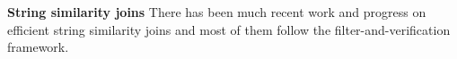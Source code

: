 




\smallskip

\noindent \textbf{String similarity joins}  There has been much recent work and progress on efficient string similarity joins  \cite{conf/sigmod/LuLWLW13,conf/icde/ArasuCK08,conf/cpm/BarbayGMR06,conf/vldb/ArvindSR09} and most of them follow the filter-and-verification framework. 

